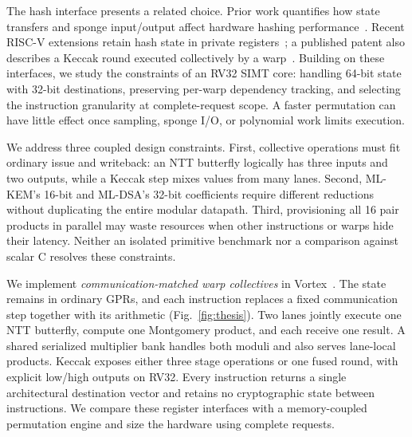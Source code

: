 \documentclass[conference,letterpaper]{IEEEtran}
\begin{document}
The hash interface presents a related choice. Prior work quantifies how
state transfers and sponge input/output affect hardware hashing
performance~\cite{karl}. Recent RISC-V extensions retain hash state in private
registers~\cite{horcrux}; a published patent also describes a Keccak round
executed collectively by a warp~\cite{collectivepatent}. Building on these
interfaces, we study the constraints of an RV32 SIMT core: handling 64-bit
state with 32-bit destinations, preserving per-warp dependency tracking, and
selecting the instruction granularity at complete-request scope. A faster
permutation can have little effect once sampling, sponge I/O, or polynomial
work limits execution.

We address three coupled design constraints. First, collective operations
must fit ordinary issue and writeback: an NTT butterfly logically has three
inputs and two outputs, while a Keccak step mixes values from many lanes.
Second, ML-KEM's 16-bit and ML-DSA's 32-bit coefficients require different
reductions without duplicating the entire modular datapath. Third, provisioning
all 16 pair products in parallel may waste resources when other instructions
or warps hide their latency. Neither an isolated primitive benchmark nor a
comparison against scalar C resolves these constraints.

We implement \emph{communication-matched warp collectives} in
Vortex~\cite{vortex}. The state remains in ordinary GPRs, and each instruction
replaces a fixed communication step together with its arithmetic
(Fig.~\ref{fig:thesis}). Two lanes jointly execute one NTT butterfly, compute
one Montgomery product, and each receive one result. A shared serialized
multiplier bank handles both moduli and also serves lane-local products.
Keccak exposes either three stage operations or one fused round, with
explicit low/high outputs on RV32. Every instruction returns a single
architectural destination vector and retains no cryptographic state between
instructions. We compare these register interfaces with a memory-coupled
permutation engine and size the hardware using complete requests.
\end{document}

